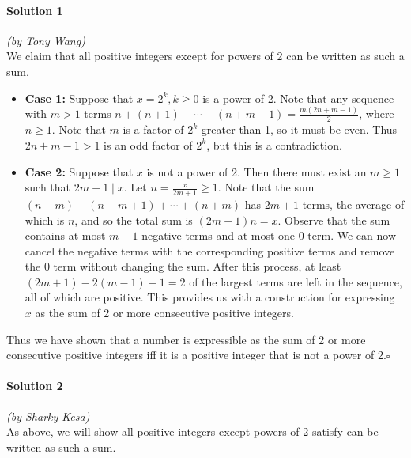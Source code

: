 \documentclass[10pt]{article}
\begin{document}
	\paragraph{Solution 1} \textit{(by Tony Wang)}\\
	
	\noindent We claim that all positive integers except for powers of 2 can be written as such a sum.
	\begin{itemize}
	\item \textbf{Case 1:} Suppose that \(x = 2^k, k \geq 0\) is a power of 2. Note that any sequence with \(m > 1\) terms \(n + (n+1) + \cdots + (n+m-1) = \frac{m(2n+m-1)}{2}\), where \(n \geq 1\). Note that \(m\) is a factor of \(2^k\) greater than 1, so it must be even. Thus \(2n+m-1 > 1\) is an odd factor of \(2^k\), but this is a contradiction.
	\item \textbf{Case 2:} Suppose that \(x\) is not a power of 2. Then there must exist an \(m \geq 1\) such that \(2m+1 \mid x\). Let \(n = \frac{x}{2m+1} \geq 1\). Note that the sum \((n-m) + (n-m+1) + \cdots + (n+m)\) has \(2m+1\) terms, the average of which is \(n\), and so the total sum is \((2m+1)n = x\). Observe that the sum contains at most \(m-1\) negative terms and at most one \(0\) term. We can now cancel the negative terms with the corresponding positive terms and remove the 0 term without changing the sum. After this process, at least \((2m+1) - 2(m-1) - 1 = 2\) of the largest terms are left in the sequence, all of which are positive. This provides us with a construction for expressing \(x\) as the sum of 2 or more consecutive positive integers.
	\end{itemize}
	
	\noindent Thus we have shown that a number is expressible as the sum of 2 or more consecutive positive integers iff it is a positive integer that is not a power of 2.\hfill\ensuremath{\square}\\
	
		\noindent \makebox[\linewidth]{\rule{\textwidth}{0.4pt}}
	
	\paragraph{Solution 2} \textit{(by Sharky Kesa)}\\
	
	\noindent As above, we will show all positive integers except powers of 2 satisfy can be written as such a sum.
	
\end{document}
